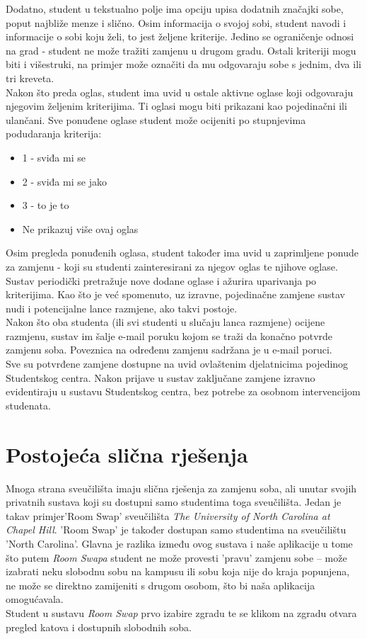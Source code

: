 		Dodatno, student u tekstualno polje ima opciju upisa dodatnih značajki sobe, poput najbliže menze i slično. Osim informacija o svojoj sobi, student navodi i informacije o sobi koju želi, to jest željene kriterije. Jedino se ograničenje odnosi na grad - student ne može tražiti zamjenu u drugom gradu. Ostali kriteriji mogu biti i višestruki, na primjer može označiti da mu odgovaraju sobe s jednim, dva ili tri kreveta.\\
		Nakon što preda oglas, student ima uvid u ostale aktivne oglase koji odgovaraju njegovim željenim kriterijima. Ti oglasi mogu biti prikazani kao pojedinačni ili ulančani. Sve ponuđene oglase student može ocijeniti po stupnjevima podudaranja kriterija:
		\begin{itemize}
			\item 1 - sviđa mi se
			\item 2 - sviđa mi se jako
			\item 3 - to je to
			\item Ne prikazuj više ovaj oglas
		\end{itemize} 
		Osim pregleda ponuđenih oglasa, student također ima uvid u zaprimljene ponude za zamjenu - koji su studenti zainteresirani za njegov oglas te njihove oglase.\\
		Sustav periodički pretražuje nove dodane oglase i ažurira uparivanja po kriterijima. Kao što je već spomenuto, uz izravne, pojedinačne zamjene sustav nudi i potencijalne lance razmjene, ako takvi postoje.\\
		Nakon što oba studenta (ili svi studenti u slučaju lanca razmjene) ocijene razmjenu, sustav im šalje e-mail poruku kojom se traži da konačno potvrde zamjenu soba. Poveznica na određenu zamjenu sadržana je u e-mail poruci. \\
		Sve su potvrđene zamjene dostupne na uvid ovlaštenim djelatnicima pojedinog Studentskog centra. Nakon prijave u sustav zaključane zamjene izravno evidentiraju u sustavu Studentskog centra, bez potrebe za osobnom intervencijom studenata.
		
		\clearpage
		
		
		\section{Postojeća slična rješenja}
		
		Mnoga strana sveučilišta imaju slična rješenja za zamjenu soba, ali unutar svojih privatnih sustava koji su dostupni samo studentima toga sveučilišta. Jedan je takav primjer'Room Swap' sveučilišta \textit{The University of North Carolina at Chapel Hill}. 'Room Swap' je također dostupan samo studentima na sveučilištu 'North Carolina'. 
		Glavna je razlika između ovog sustava i naše aplikacije u tome što putem \textit{Room Swapa} student ne može provesti 'pravu' zamjenu sobe – može izabrati neku slobodnu sobu na kampusu ili sobu koja nije do kraja popunjena, ne može se direktno zamijeniti s drugom osobom, što bi naša aplikacija omogućavala.\\ 
		Student u sustavu \textit{Room Swap} prvo izabire zgradu te se klikom na zgradu otvara pregled katova i dostupnih slobodnih soba.
		
